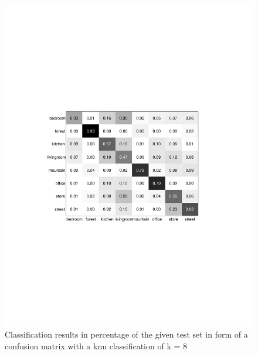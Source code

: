 \documentclass[subfigure,epsfig,fleqn,float,numbers=noenddot]{scrartcl}
\begin{document}
\begin{figure}
		\centering
		\includegraphics[width=\textwidth]{img/conf_matrix_k8.pdf}
		\caption{Classification results in percentage of the given test set in form of a confusion matrix with a knn classification of k = 8}
		\label{fig:knn}
\end{figure}
\end{document}
